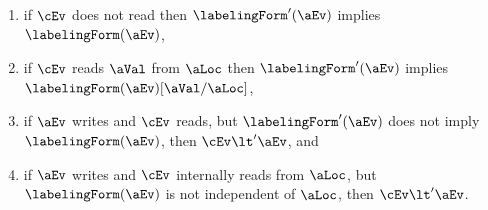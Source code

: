 \begin{definition}
\begin{enumerate}
\item\label{dis-int1} if $\cEv$ does not \externally read then
  $\labelingForm'(\aEv)$ implies $\labelingForm(\aEv)$,
\item\label{dis-ext1} if $\cEv$ \externally reads $\aVal$ from
  $\aLoc$ then $\labelingForm'(\aEv)$ implies
  $\labelingForm(\aEv)[\aVal/\aLoc]$,
\item\label{dis-ext2} if $\aEv$ writes and $\cEv$ \externally reads, but
  $\labelingForm'(\aEv)$ does not imply $\labelingForm(\aEv)$, then
  $\cEv\lt'\aEv$, and
\item\label{dis3-int2} if $\aEv$ writes and $\cEv$ internally reads from
  $\aLoc$,  but $\labelingForm(\aEv)$ is not independent of $\aLoc$, then 
  $\cEv\lt'\aEv$.
\end{enumerate}
\end{definition}

